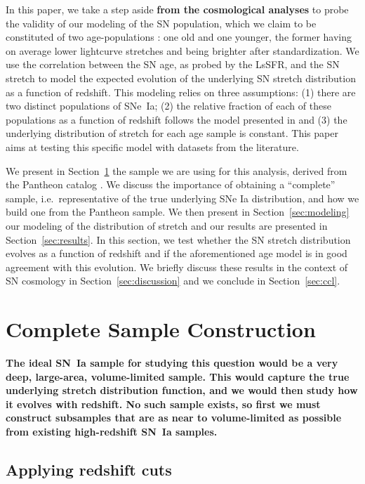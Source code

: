 \documentclass[]{aa}
\begin{document}
In this paper, we take a step aside \textbf{from the cosmological analyses} to
probe the validity of our modeling of the SN population, which we claim to be
constituted of two age-populations \citep{rigault2013,rigault2015,rigault2020}:
one old and one younger, the former having on average lower lightcurve stretches
and being brighter after standardization. We use the correlation between the SN
age, as probed by the LsSFR, and the SN stretch to model the expected evolution
of the underlying SN stretch distribution as a function of redshift. This
modeling relies on three assumptions: (1) there are two distinct populations of
SNe~Ia; (2) the relative fraction of each of these populations as a function of
redshift follows the model presented in \cite{rigault2020} and (3) the
underlying distribution of stretch for each age sample is constant. This paper
aims at testing this specific model with datasets from the literature. 

We present in Section~\ref{sec:sample} the sample we are using for this
analysis, derived from the Pantheon catalog \citep{scolnic2018a}. We discuss the
importance of obtaining a ``complete'' sample, i.e.\ representative of the true
underlying SNe Ia distribution, and how we build one from the Pantheon sample.
We then present in Section~\ref{sec:modeling} our modeling of the distribution
of stretch and our results are presented in Section~\ref{sec:results}. In this
section, we test whether the SN stretch distribution evolves as a function of
redshift and if the aforementioned age model is in good agreement with this
evolution. We briefly discuss these results in the context of SN cosmology in
Section~\ref{sec:discussion} and we conclude in Section~\ref{sec:ccl}.

\section{Complete Sample Construction}\label{sec:sample}

\textbf{The ideal SN~Ia sample for studying this question would be a very deep,
    large-area, volume-limited sample. This would capture the true underlying
    stretch distribution function, and we would then study how it evolves with
    redshift. No such sample exists, so first we must construct subsamples that
are as near to volume-limited as possible from existing high-redshift SN~Ia
samples.}

\subsection{Applying redshift cuts}\label{ssec:cuts}
\end{document}
